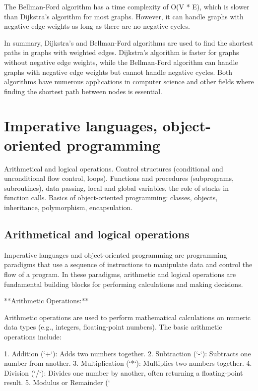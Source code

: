 \documentclass{article}
\begin{document}
The Bellman-Ford algorithm has a time complexity of O(V * E), which is slower than Dijkstra's algorithm for most graphs. However, it can handle graphs with negative edge weights as long as there are no negative cycles.

In summary, Dijkstra's and Bellman-Ford algorithms are used to find the shortest paths in graphs with weighted edges. Dijkstra's algorithm is faster for graphs without negative edge weights, while the Bellman-Ford algorithm can handle graphs with negative edge weights but cannot handle negative cycles. Both algorithms have numerous applications in computer science and other fields where finding the shortest path between nodes is essential.


\section{Imperative languages, object-oriented programming}

Arithmetical and logical operations. Control structures (conditional and unconditional flow control, loops). Functions and procedures (subprograms, subroutines), data passing, local and global variables, the role of stacks in function calls. Basics of object-oriented programming: classes, objects, inheritance, polymorphism, encapsulation.


\subsection{Arithmetical and logical operations}

Imperative languages and object-oriented programming are programming paradigms that use a sequence of instructions to manipulate data and control the flow of a program. In these paradigms, arithmetic and logical operations are fundamental building blocks for performing calculations and making decisions.

**Arithmetic Operations:**

Arithmetic operations are used to perform mathematical calculations on numeric data types (e.g., integers, floating-point numbers). The basic arithmetic operations include:

1. Addition (`+`): Adds two numbers together.
2. Subtraction (`-`): Subtracts one number from another.
3. Multiplication (`*`): Multiplies two numbers together.
4. Division (`/`): Divides one number by another, often returning a floating-point result.
5. Modulus or Remainder (`%
\end{document}
